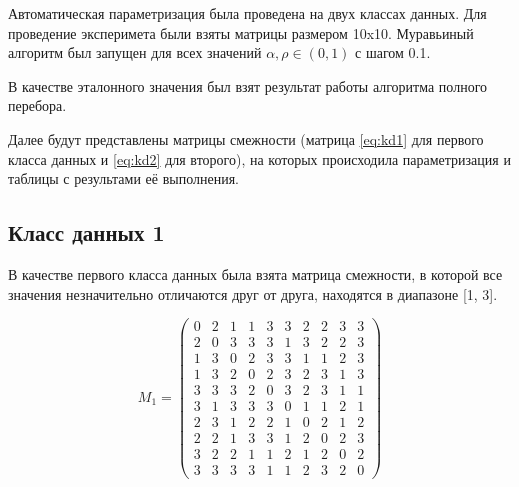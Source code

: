 \documentclass[a4paper,14pt, unknownkeysallowed]{extreport}
\begin{document}
Автоматическая параметризация была проведена на двух классах данных. Для проведение эксперимета были взяты матрицы размером 10x10. Муравьиный алгоритм был запущен для всех значений $\alpha, \rho \in (0, 1)$ с шагом 0.1.

В качестве эталонного значения был взят результат работы алгоритма полного перебора. 

Далее будут представлены матрицы смежности (матрица \ref{eq:kd1} для первого класса данных и \ref{eq:kd2} для второго), на которых происходила параметризация и таблицы с результами её выполнения.

\subsection{Класс данных 1}

В качестве первого класса данных была взята матрица смежности, в которой все значения незначительно отличаются друг от друга, находятся в диапазоне [1, 3].

\begin{equation}
    \label{eq:kd1}
	M_{1} = \begin{pmatrix}
		0 & 2 & 1 & 1 & 3 & 3 & 2 & 2 & 3 & 3 \\
		2 & 0 & 3 & 3 & 3 & 1 & 3 & 2 & 2 & 3 \\
		1 & 3 & 0 & 2 & 3 & 3 & 1 & 1 & 2 & 3 \\
		1 & 3 & 2 & 0 & 2 & 3 & 2 & 3 & 1 & 3 \\
		3 & 3 & 3 & 2 & 0 & 3 & 2 & 3 & 1 & 1 \\
		3 & 1 & 3 & 3 & 3 & 0 & 1 & 1 & 2 & 1 \\
		2 & 3 & 1 & 2 & 2 & 1 & 0 & 2 & 1 & 2 \\
		2 & 2 & 1 & 3 & 3 & 1 & 2 & 0 & 2 & 3 \\
		3 & 2 & 2 & 1 & 1 & 2 & 1 & 2 & 0 & 2 \\
		3 & 3 & 3 & 3 & 1 & 1 & 2 & 3 & 2 & 0 
	\end{pmatrix}
\end{equation}

\clearpage
\end{document}
